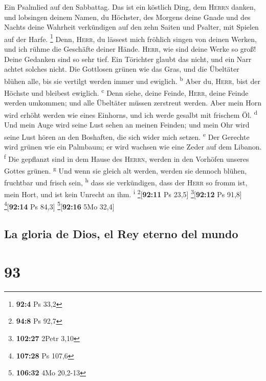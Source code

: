  Ein Psalmlied auf den Sabbattag.  Das ist
ein köstlich Ding, dem \textsc{Herrn} danken, und lobsingen deinem
Namen, du Höchster,  des Morgens deine Gnade und des
Nachts deine Wahrheit verkündigen  auf den zehn Saiten und
Psalter, mit Spielen auf der Harfe. \footnote{\textbf{92:4} Ps 33,2}
 Denn, \textsc{Herr}, du lässest mich fröhlich singen von
deinen Werken, und ich rühme die Geschäfte deiner Hände. 
\textsc{Herr}, wie sind deine Werke so groß! Deine Gedanken sind so sehr
tief.  Ein Törichter glaubt das nicht, und ein Narr achtet
solches nicht.  Die Gottlosen grünen wie das Gras, und die
Übeltäter blühen alle, bis sie vertilgt werden immer und ewiglich.
\textsuperscript{b}  Aber du, \textsc{Herr}, bist der
Höchste und bleibest ewiglich. \textsuperscript{c}  Denn
siehe, deine Feinde, \textsc{Herr}, deine Feinde werden umkommen; und
alle Übeltäter müssen zerstreut werden.  Aber mein Horn
wird erhöht werden wie eines Einhorns, und ich werde gesalbt mit
frischem Öl. \textsuperscript{d}  Und mein Auge wird
seine Lust sehen an meinen Feinden; und mein Ohr wird seine Lust hören
an den Boshaften, die sich wider mich setzen. \textsuperscript{e}
 Der Gerechte wird grünen wie ein Palmbaum; er wird
wachsen wie eine Zeder auf dem Libanon. \textsuperscript{f}
 Die gepflanzt sind in dem Hause des \textsc{Herrn},
werden in den Vorhöfen unseres Gottes grünen. \textsuperscript{g}
 Und wenn sie gleich alt werden, werden sie dennoch
blühen, fruchtbar und frisch sein, \textsuperscript{h} 
dass sie verkündigen, dass der \textsc{Herr} so fromm ist, mein Hort,
und ist kein Unrecht an ihm. \textsuperscript{i}
\footnote{\textbf{94:8} Ps 92,7}{[}\textbf{92:11} Ps 23,5{]}
\footnote{\textbf{102:27} 2Petr 3,10}{[}\textbf{92:12} Ps 91,8{]}
\footnote{\textbf{107:28} Ps 107,6}{[}\textbf{92:14} Ps 84,3{]}
\footnote{\textbf{106:32} 4Mo 20,2-13}{[}\textbf{92:16} 5Mo 32,4{]}

\hypertarget{la-gloria-de-dios-el-rey-eterno-del-mundo}{%
\subsection{La gloria de Dios, el Rey eterno del
mundo}\label{la-gloria-de-dios-el-rey-eterno-del-mundo}}

\hypertarget{section-92}{%
\section{93}\label{section-92}}

